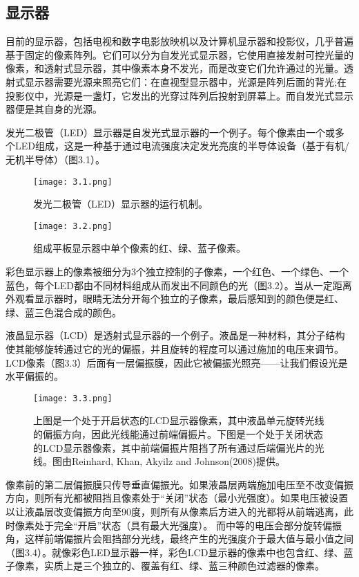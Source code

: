 \documentclass[lang=cn,12pt]{elegantbook}
\begin{document}
\subsection{显示器}

目前的显示器，包括电视和数字电影放映机以及计算机显示器和投影仪，几乎普遍基于固定的像素阵列。它们可以分为自发光式显示器，它使用直接发射可控光量的像素，和透射式显示器，其中像素本身不发光，而是改变它们允许通过的光量。透射式显示器需要光源来照亮它们：在直视型显示器中，光源是阵列后面的背光;在投影仪中，光源是一盏灯，它发出的光穿过阵列后投射到屏幕上。而自发光式显示器便是其自身的光源。

发光二极管（LED）显示器是自发光式显示器的一个例子。每个像素由一个或多个LED组成，这是一种基于通过电流强度决定发光亮度的半导体设备（基于有机/无机半导体）（图3.1）。

\begin{figure}[htb]
  \centering
  \begin{minipage}[t]{0.45\textwidth}
    \centering
    \texttt{[image: 3.1.png]}
    \caption{发光二极管（LED）显示器的运行机制。}
  \end{minipage}
  \begin{minipage}[t]{0.45\textwidth}
    \centering
    \texttt{[image: 3.2.png]}
    \caption{组成平板显示器中单个像素的红、绿、蓝子像素。}
  \end{minipage}
\end{figure}

彩色显示器上的像素被细分为3个独立控制的子像素，一个红色、一个绿色、一个蓝色，每个LED都由不同材料组成从而发出不同颜色的光（图3.2）。当从一定距离外观看显示器时，眼睛无法分开每个独立的子像素，最后感知到的颜色便是红、绿、蓝三色混合成的颜色。

液晶显示器（LCD）是透射式显示器的一个例子。液晶是一种材料，其分子结构使其能够旋转通过它的光的偏振，并且旋转的程度可以通过施加的电压来调节。LCD像素（图3.3）后面有一层偏振膜，因此它被偏振光照亮——让我们假设光是水平偏振的。

\begin{figure}[htb]
  \centering
  \texttt{[image: 3.3.png]}
  \caption{上图是一个处于开启状态的LCD显示器像素，其中液晶单元旋转光线的偏振方向，因此光线能通过前端偏振片。下图是一个处于关闭状态的LCD显示器像素，其中前端偏振片阻挡了所有通过后端偏光片的光线。图由Reinhard, Khan, Akyilz and Johnson(2008)提供。}
\end{figure}

像素前的第二层偏振膜只传导垂直偏振光。如果液晶层两端施加电压至不改变偏振方向，则所有光都被阻挡且像素处于“关闭”状态（最小光强度）。如果电压被设置以让液晶层改变偏振方向至90度，则所有从像素后方进入的光都将从前端逃离，此时像素处于完全“开启”状态（具有最大光强度）。 而中等的电压会部分旋转偏振角，这样前端偏振片会阻挡部分光线，最终产生的光强度介于最大值与最小值之间（图3.4）。就像彩色LED显示器一样，彩色LCD显示器的像素中也包含红、绿、蓝子像素，实质上是三个独立的、覆盖有红、绿、蓝三种颜色过滤器的像素。
\end{document}
